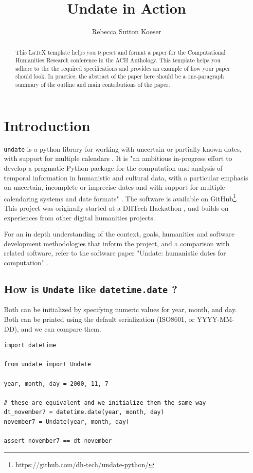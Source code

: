 \documentclass{anthology-ch}         %
\title{Undate in Action}
\author[1]{Rebecca Sutton Koeser}[
  orcid=0000-0002-8762-8057
]
\affiliation{1}{Center for Digital Humanities, Princeton University, Princeton, New Jersey, USA}
\begin{document}
\maketitle

\begin{abstract}
This LaTeX template helps you typeset and format a paper for the Computational Humanities Research conference in the ACH Anthology. This template helps you adhere to the the required specifications and provides an example of how your paper should look. In practice, the abstract of the paper here should be a one-paragraph summary of the outline and main contributions of the paper. 
\end{abstract}

\section{Introduction} 


\texttt{undate} is a python library for working with uncertain or partially known dates, with support for multiple calendars \cite{koeser_undate_2025}. It is "an ambitious in-progress effort to develop a pragmatic Python package for the computation and analysis of temporal information in humanistic and cultural data, with a particular emphasis on uncertain, incomplete or imprecise dates and with support for multiple calendaring systems and date formats" \cite{koeser_princeton_2025}. The software is available on GitHub\footnote{https://github.com/dh-tech/undate-python/}. This project was originally started at a DHTech Hackathon \cite{koeser_join_2023}, and builds on experiences from other digital humanities projects.

For an in depth understanding of the context, goals, humanities and software development methodologies that inform the project, and a comparison with related software, refer to the software paper "Undate: humanistic dates for computation" \cite{koeser_princeton_2025}.


\subsection{How is \texttt{Undate} like \texttt{datetime.date} ?} \label{sec:intro_details}


Both can be initialized by specifying numeric values for year, month, and day. Both can be printed using the default serialization (ISO8601, or YYYY-MM-DD), and we can compare them.

\begin{verbatim}
import datetime

from undate import Undate

year, month, day = 2000, 11, 7

# these are equivalent and we initialize them the same way
dt_november7 = datetime.date(year, month, day)
november7 = Undate(year, month, day)

assert november7 == dt_november
\end{verbatim}
\end{document}
